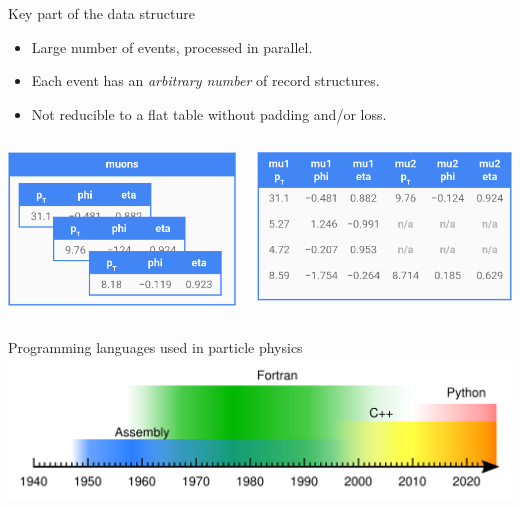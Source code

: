 \documentclass[aspectratio=169]{beamer}
\begin{document}
\begin{frame}{Key part of the data structure}
\Large
\vspace{0.25 cm}
\begin{itemize}
\item Large number of events, processed in parallel.
\item Each event has an {\it arbitrary number} of record structures.
\item Not reducible to a flat table without padding and/or loss.
\end{itemize}

\vspace{0.25 cm}
\begin{columns}
\includegraphics[width=\linewidth]{muons-as-objects.png}

\includegraphics[width=\linewidth]{muons-as-a-table.png}
\end{columns}
\end{frame}

\begin{frame}{Programming languages used in particle physics}
\vspace{0.5 cm}
\includegraphics[width=\linewidth]{programming-languages.pdf}
\end{frame}


\begin{frame}{}
\end{frame}
\end{document}
